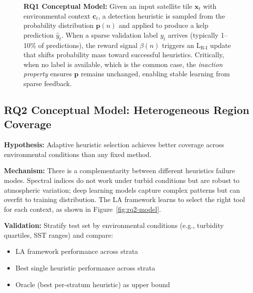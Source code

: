 \documentclass[12pt,oneside]{book}
\begin{document}
\begin{figure}[H]
\begin{tikzpicture}
    \end{tikzpicture}
    \caption{\textbf{RQ1 Conceptual Model:} Given an input satellite tile $\mathbf{x}_t$ with environmental context $\mathbf{c}_t$, a detection heuristic is sampled from the probability distribution $\mathbf{p}(n)$ and applied to produce a kelp prediction $\hat{y}_t$. When a sparse validation label $y_t$ arrives (typically 1--10\% of predictions), the reward signal $\beta(n)$ triggers an L$_\text{R-I}$ update that shifts probability mass toward successful heuristics. Critically, when no label is available, which is the common case, the \emph{inaction property} ensures $\mathbf{p}$ remains unchanged, enabling stable learning from sparse feedback.}
    \label{fig:rq1-model}
\end{figure}

\subsection{RQ2 Conceptual Model: Heterogeneous Region Coverage}
\label{subsec:rq2-model}

\textbf{Hypothesis:} Adaptive heuristic selection achieves better coverage across environmental conditions than any fixed method.

\textbf{Mechanism:} There is a complementarity between different heuristics failure modes. Spectral indices do not work under turbid conditions but are robust to atmospheric variation; deep learning models capture complex patterns but can overfit to training distribution. The LA framework learns to select the right tool for each context, as shown in Figure~\ref{fig:rq2-model}.

\textbf{Validation:} Stratify test set by environmental conditions (e.g., turbidity quartiles, SST ranges) and compare:
\begin{itemize}
    \item LA framework performance across strata
    \item Best single heuristic performance across strata
    \item Oracle (best per-stratum heuristic) as upper bound
\end{itemize}
\end{document}
